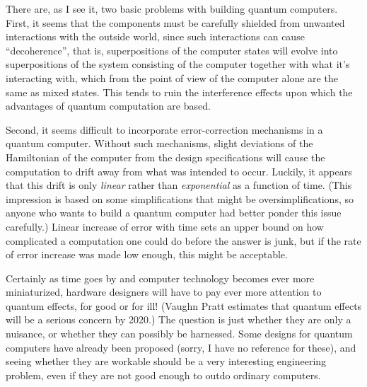 \documentclass{article}
\def\tightlist{}
\renewcommand{\texttt}[1]{%
  \begingroup
  \ttfamily
  \begingroup\lccode`~=`/\lowercase{\endgroup\def~}{/\discretionary{}{}{}}%
  \begingroup\lccode`~=`[\lowercase{\endgroup\def~}{[\discretionary{}{}{}}%
  \begingroup\lccode`~=`.\lowercase{\endgroup\def~}{.\discretionary{}{}{}}%
  \catcode`/=\active\catcode`[=\active\catcode`.=\active
  \scantokens{#1\noexpand}%
  \endgroup
}
\begin{document}
There are, as I see it, two basic problems with building quantum
computers. First, it seems that the components must be carefully
shielded from unwanted interactions with the outside world, since such
interactions can cause ``decoherence'', that is, superpositions of the
computer states will evolve into superpositions of the system consisting
of the computer together with what it's interacting with, which from the
point of view of the computer alone are the same as mixed states. This
tends to ruin the interference effects upon which the advantages of
quantum computation are based.

Second, it seems difficult to incorporate error-correction mechanisms in
a quantum computer. Without such mechanisms, slight deviations of the
Hamiltonian of the computer from the design specifications will cause
the computation to drift away from what was intended to occur. Luckily,
it appears that this drift is only \emph{linear} rather than
\emph{exponential} as a function of time. (This impression is based on
some simplifications that might be oversimplifications, so anyone who
wants to build a quantum computer had better ponder this issue
carefully.) Linear increase of error with time sets an upper bound on
how complicated a computation one could do before the answer is junk,
but if the rate of error increase was made low enough, this might be
acceptable.

Certainly as time goes by and computer technology becomes ever more
miniaturized, hardware designers will have to pay ever more attention to
quantum effects, for good or for ill! (Vaughn Pratt estimates that
quantum effects will be a serious concern by 2020.) The question is just
whether they are only a nuisance, or whether they can possibly be
harnessed. Some designs for quantum computers have already been proposed
(sorry, I have no reference for these), and seeing whether they are
workable should be a very interesting engineering problem, even if they
are not good enough to outdo ordinary computers.

\end{document}
